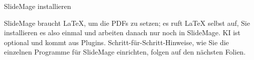 

\begin{sectionframe}{SlideMage installieren}
	\begin{minipage}[t]{0.9\linewidth}\small
		SlideMage braucht LaTeX, um die PDFs zu setzen; es ruft LaTeX selbst auf, Sie installieren es also einmal und arbeiten danach nur noch in SlideMage. KI ist optional und kommt aus Plugins. Schritt-für-Schritt-Hinweise, wie Sie die einzelnen Programme für SlideMage einrichten, folgen auf den nächsten Folien.
	\end{minipage}\par\medskip
	\SMChapterAgenda
\end{sectionframe}
